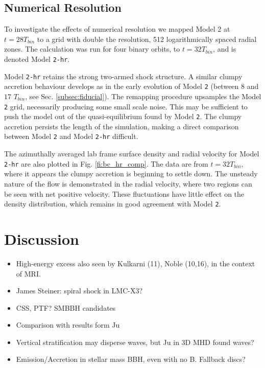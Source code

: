 \documentclass{emulateapj}
\newcommand{\model}[1]{{Model \texttt{#1}}}
\begin{document}
\subsection{Numerical Resolution}
\label{subsec:res}

To investigate the effects of numerical resolution we mapped Model 2 at $t=28T_{bin}$ to a grid with double the resolution, 512 logarithmically spaced radial zones.  The calculation was run for four binary orbits, to $t = 32 T_{bin}$, and is denoted Model \texttt{2-hr}.

Model \texttt{2-hr} retains the strong two-armed shock structure. A similar clumpy accretion behaviour develops as in the early evolution of \model{2} (between $8$ and $17$ $T_{bin}$, see Sec. \ref{subsec:fiducial}).  The remapping procedure upsamples the \model{2} grid, necessarily producing some small scale noise.  This may be sufficient to push the model out of the quasi-equilibrium found by \model{2}. The clumpy accretion persists the length of the simulation, making a direct comparison between \model{2} and \model{2-hr} difficult.

The azimuthally averaged lab frame surface density and radial velocity for \model{2-hr} are also plotted in Fig. \ref{fi:bc_hr_comp}.  The data are from $t = 32T_{bin}$, where it appears the clumpy accretion is beginning to settle down.  The unsteady nature of the flow is demonstrated in the radial velocity, where two regions can be seen with net positive velocity.  These fluctuations have little effect on the density distribution, which remains in good agreement with \model{2}.



\section{Discussion}
\label{sec:discussion}

\begin{itemize}
	\item High-energy excess also seen by Kulkarni (11), Noble (10,16), in the context of MRI.  
	\item James Steiner: spiral shock in LMC-X3?
	\item CSS, PTF? SMBBH candidates
	\item Comparison with results form Ju
	\item Vertical stratification may disperse waves, but Ju in 3D MHD found waves?
	\item Emission/Accretion in stellar mass BBH, even with no B.  Fallback discs?
\end{itemize}
\end{document}
